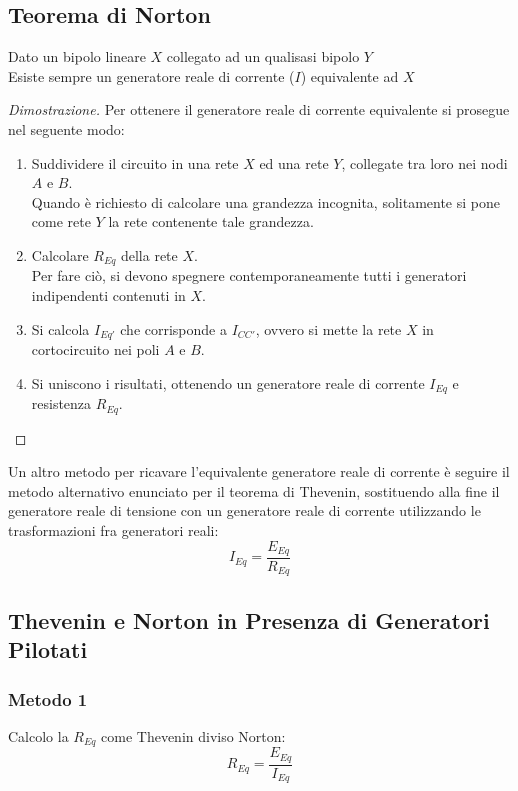 \documentclass[../main.tex]{subfiles}
\begin{document}
	\subsection{Teorema di Norton}
	\begin{theorem}
		Dato un bipolo lineare $X$ collegato ad un qualisasi bipolo $Y$\\
		Esiste sempre un generatore reale di corrente ($I$) equivalente ad $X$
	\end{theorem}
	\begin{proof}[Dimostrazione]
		Per ottenere il generatore reale di corrente equivalente si prosegue nel seguente modo:
		\begin{enumerate}
			\item Suddividere il circuito in una rete $X$ ed una rete $Y$, collegate tra loro nei nodi $A$ e $B$.\\
			Quando è richiesto di calcolare una grandezza incognita, solitamente si pone come rete $Y$ la rete contenente tale grandezza.
			\item Calcolare $R_{Eq}$ della rete $X$.\\
			Per fare ciò, si devono spegnere contemporaneamente tutti i generatori indipendenti contenuti in $X$.
			\item Si calcola $I_{Eq'}$ che corrisponde a $I_{CC'}$, ovvero si mette la rete $X$ in cortocircuito nei poli $A$ e $B$.
			\item Si uniscono i risultati, ottenendo un generatore reale di corrente $I_{Eq}$ e resistenza $R_{Eq}$.
		\end{enumerate}
	\end{proof}
	Un altro metodo per ricavare l’equivalente generatore reale di corrente è seguire il metodo alternativo enunciato
	per il teorema di Thevenin, sostituendo alla fine il generatore reale di tensione con un generatore reale di
	corrente utilizzando le trasformazioni fra generatori reali:
	\begin{equation}
		I_{Eq} = \frac{E_{Eq}}{R_{Eq}}
	\end{equation}
	\subsection{Thevenin e Norton in Presenza di Generatori Pilotati}
	\subsubsection{Metodo 1}
	Calcolo la $R_{Eq}$ come Thevenin diviso Norton:
	\[R_{Eq} = \frac{E_{Eq}}{I_{Eq}}\]
\end{document}
